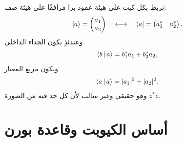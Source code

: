 نربط بكل كيت على هيئة عمود برا مرافقًا على هيئة صف:
\begin{equation}
  \left\lvert a\right\rangle=
  \begin{pmatrix}a_1\\a_2\end{pmatrix}
  \quad\longleftrightarrow\quad
  \left\langle a\right\rvert=
  \begin{pmatrix}a_1^*&a_2^*\end{pmatrix}.
  \label{eq:l02-bra-ket-components}
\end{equation}
وعندئذٍ يكون الجداء الداخلي
\begin{equation}
  \left\langle b\,\middle|\,a\right\rangle=b_1^*a_1+b_2^*a_2,
  \label{eq:l02-inner-product}
\end{equation}
ويكون مربع المعيار
\begin{equation}
  \left\langle a\,\middle|\,a\right\rangle=|a_1|^2+|a_2|^2.
  \label{eq:l02-norm}
\end{equation}
وهو حقيقي وغير سالب لأن كل حد فيه من الصورة \(z^*z\).

\begin{classroomqa}
\end{classroomqa}

\section{أساس الكيوبت وقاعدة بورن}

